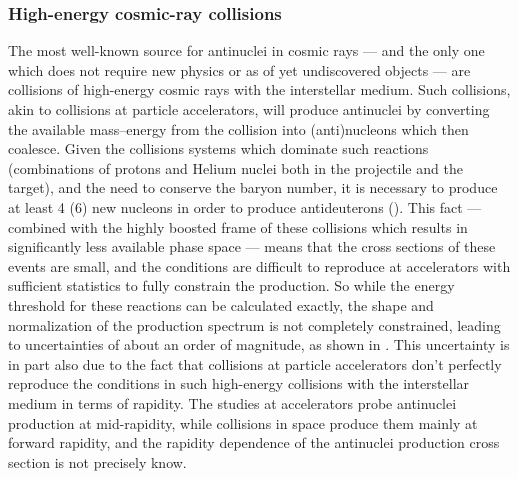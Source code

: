 \subsubsection{High-energy cosmic-ray collisions}
The most well-known source for antinuclei in cosmic rays --- and the only one which does not require new physics or as of yet undiscovered objects --- are collisions of high-energy cosmic rays with the interstellar medium. Such collisions, akin to collisions at particle accelerators, will produce antinuclei by converting the available mass--energy from the collision into (anti)nucleons which then coalesce. Given the collisions systems which dominate such reactions (combinations of protons and Helium nuclei both in the projectile and the target), and the need to conserve the baryon number, it is necessary to produce at least 4 (6) new nucleons in order to produce antideuterons (\ahe). This fact --- combined with the highly boosted frame of these collisions which results in significantly less available phase space --- means that the cross sections of these events are small, and the conditions are difficult to reproduce at accelerators with sufficient statistics to fully constrain the production. So while the energy threshold for these reactions can be calculated exactly, the shape and normalization of the production spectrum is not completely constrained, leading to uncertainties of about an order of magnitude, as shown in \cite{}. This uncertainty is in part also due to the fact that collisions at particle accelerators don't perfectly reproduce the conditions in such high-energy collisions with the interstellar medium in terms of rapidity. The studies at accelerators probe antinuclei production at mid-rapidity, while collisions in space produce them mainly at forward rapidity, and the rapidity dependence of the antinuclei production cross section is not precisely know\cite{}. \\

